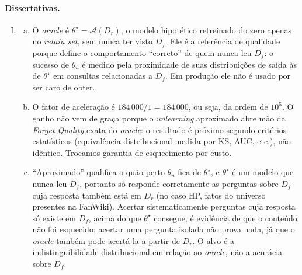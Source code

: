 \documentclass{dlproblemset}
\begin{document}
\paragraph{Dissertativas.}
\begin{enumerate}[I)]
    \item
    \begin{enumerate}[(a)]
        \item O \textit{oracle} é $\theta^\star = \mathcal{A}(D_r)$, o modelo hipotético retreinado do zero apenas no \textit{retain set}, sem nunca ter visto $D_f$. Ele é a referência de qualidade porque define o comportamento ``correto'' de quem nunca leu $D_f$: o sucesso de $\theta_u$ é medido pela proximidade de suas distribuições de saída às de $\theta^\star$ em consultas relacionadas a $D_f$. Em produção ele não é usado por ser caro de obter.
        \item O fator de aceleração é $184\,000/1 = 184\,000$, ou seja, da ordem de $10^5$. O ganho não vem de graça porque o \textit{unlearning} aproximado abre mão da \textit{Forget Quality} exata do \textit{oracle}: o resultado é próximo segundo critérios estatísticos (equivalência distribucional medida por KS, AUC, etc.), não idêntico. Trocamos garantia de esquecimento por custo.
        \item ``Aproximado'' qualifica o quão perto $\theta_u$ fica de $\theta^\star$, e $\theta^\star$ é um modelo que nunca leu $D_f$, portanto só responde corretamente as perguntas sobre $D_f$ cuja resposta também está em $D_r$ (no caso HP, fatos do universo presentes na FanWiki). Acertar sistematicamente perguntas cuja resposta só existe em $D_f$, acima do que $\theta^\star$ consegue, é evidência de que o conteúdo não foi esquecido; acertar uma pergunta isolada não prova nada, já que o \textit{oracle} também pode acertá-la a partir de $D_r$. O alvo é a indistinguibilidade distribucional em relação ao \textit{oracle}, não a acurácia sobre $D_f$.
    \end{enumerate}


\end{enumerate}
\end{document}

